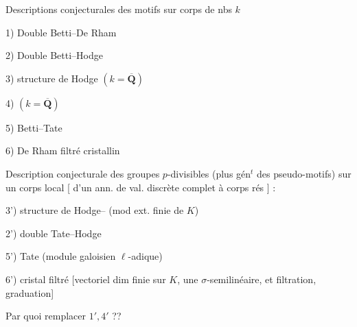 Descriptions conjecturales des motifs sur corps de nbs  $k$

1) Double  Betti--De Rham

2) Double  Betti--Hodge

3)  structure de Hodge $(k=\overline{\mathbf Q})$

4) 
 $(k=\overline{\mathbf Q})$

5)  Betti--Tate

6)  De Rham filtré cristallin

Description conjecturale des groupes $p$-divisibles 
(plus gén$^t$ des pseudo-motifs) sur un corps local
[ d’un ann. de val. discrète complet
à corps rés ] :

3') structure de Hodge--
(mod ext. finie de $K$)

2') double  Tate--Hodge

5') Tate (module galoisien $\ell$-adique)

6')  cristal filtré
[vectoriel  dim finie sur $K$, une 
$\sigma$-semilinéaire, et filtration, graduation]

Par quoi remplacer $1',4'$ ??
